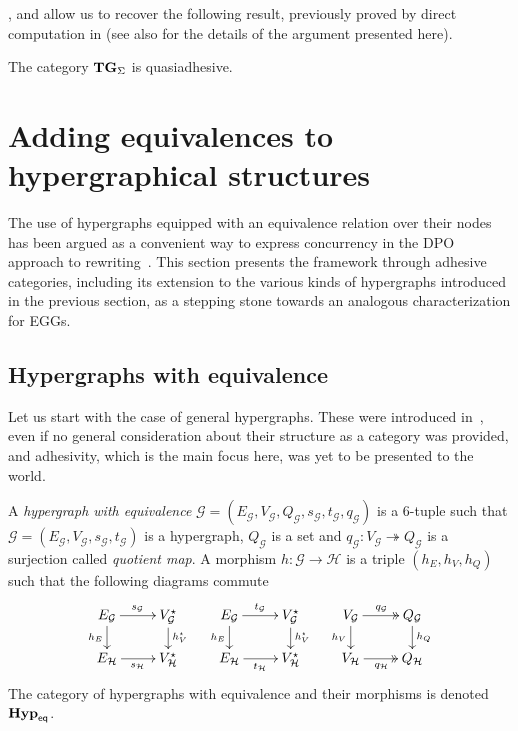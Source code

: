 \documentclass[3p]{elsarticle}
\newcommand{\catname}[1]{\textbf{\textup{#1}}}
\newcommand{\EqHyp}{\catname{Hyp}_{\mathsf{eq}}} %
\newcommand{\tg}[0]{\catname{TG}_{\Sigma}}
\newcommand{\eto}{\twoheadrightarrow}
\theoremstyle{remark}
\theoremstyle{definition}
\begin{document}
,  and  allow us to recover the following result, previously proved by direct computation in \cite[Thm.~4.2]{CorradiniG05} (see also \cite[Cor.~5.15]{CastelnovoGM24} for the details of the argument presented here).
\begin{cor}\label{cor:term}
	The category $\tg$ is quasiadhesive.
\end{cor}
\fi 
\section{Adding equivalences to hypergraphical structures}
\label{hypereq}
The use of hypergraphs equipped with an equivalence relation over their nodes has been argued as a convenient way to express concurrency in the DPO approach to rewriting~\cite{concur2006}.
This section presents the framework through adhesive categories, including its extension to the various kinds of hypergraphs introduced in the previous section, as a stepping stone towards an analogous characterization for EGGs.

\subsection{Hypergraphs with equivalence}

Let us start with the case of general hypergraphs. These were introduced in~\cite{concur2006}, even if no general consideration about their structure as a category was provided, and adhesivity, 
which is the main focus here, was yet to be presented to the world.

\begin{defi}
	A \emph{hypergraph with equivalence} $\mathcal{G} = (E_\mathcal{G}, V_{\mathcal{G}}, Q_\mathcal{G}, s_\mathcal{G}, t_\mathcal{G}, q_\mathcal{G})$ is a 6-tuple such that $\mathcal{G} = (E_\mathcal{G}, V_{\mathcal{G}}, s_\mathcal{G}, t_\mathcal{G})$ is a hypergraph, $Q_\mathcal{G}$ is a set and $q_{\mathcal{G}}: V_{\mathcal{G}}\eto Q_{\mathcal{G}}$ is a surjection called \emph{quotient map}. 
	A morphism $h\colon \mathcal{G\to H}$ is a triple $(h_E, h_V, h_Q)$ such that the following diagrams commute
	\[\xymatrix@R=15pt{
		{E_\mathcal{G}}\ar[r]^{s_\mathcal{G}}\ar[d]_{h_E} & {V_{\mathcal{G}}^\star}\ar[d]^{h_V^\star} & {E_\mathcal{G}}\ar[r]^{t_\mathcal{G}}\ar[d]_{h_E} & {V_{\mathcal{G}}^\star}\ar[d]^{h_V^\star} & {V_\mathcal{G}}\ar@{>>}[r]^{q_\mathcal{G}}\ar[d]_{h_V} & {Q_{\mathcal{G}}} \ar[d]^{h_Q} \\
		{E_\mathcal{H}}\ar[r]_{s_\mathcal{H}} & {V_{\mathcal{H}}^\star}	& {E_\mathcal{H}}\ar[r]_{t_\mathcal{H}} & {V_{\mathcal{H}}^\star}& {V_\mathcal{H}}\ar@{>>}[r]_{q_\mathcal{H}} & {Q_\mathcal{H}}
	}\]
	The category of hypergraphs with equivalence and their morphisms is denoted $\EqHyp$.
	
\end{defi}
\end{document}
